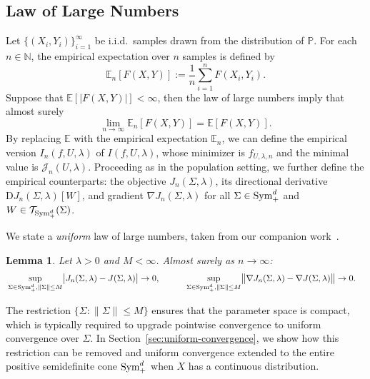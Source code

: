 \documentclass[sn-mathphys-num]{sn-jnl}%
\numberwithin{equation}{section}
\newcommand{\E}{\mathbb{E}}
\newcommand{\norm}[1]{\left\|{#1}\right\|} %
\newcommand{\N}{\mathbb{N}}
\renewcommand{\P}{\mathbb{P}}
\newtheorem{lemma}{Lemma}
\newcommand{\T}{\mathcal{T}}
\newcommand{\Sym}{{\rm \mathrm{Sym}}}
\theoremstyle{thmstyleone}%
\theoremstyle{thmstyletwo}%
\theoremstyle{thmstylethree}%
\begin{document}
\subsection{Law of Large Numbers}
\indent\indent
Let $\{(X_i, Y_i)\}_{i=1}^\infty$ be i.i.d.\ samples drawn from the distribution of $\P$.
For each $n \in \N$, the empirical expectation over $n$ samples is defined by 
\begin{equation*}
	\E_n[F(X, Y)] := \frac{1}{n} \sum_{i=1}^n F(X_i, Y_i).
\end{equation*}
Suppose that $\E[|F(X, Y)|] < \infty$, then the law of large numbers imply that almost surely 
\begin{equation*}
	\lim_{n \to \infty} \E_n[F(X, Y)] = \E[F(X, Y)].
\end{equation*}
By replacing $\E$ with the empirical expectation $\E_n$, we can define the empirical version 
$I_n(f, U, \lambda)$ of $I(f, U, \lambda)$, whose minimizer is $f_{U, \lambda, n}$ and the minimal 
value is $\mathcal{J}_n(U, \lambda)$. Proceeding as in the population setting, we further define the empirical counterparts: 
the objective $J_n(\Sigma,\lambda)$,  its directional derivative
$\mathrm{D}J_n(\Sigma,\lambda)[W]$, and gradient $\nabla J_n(\Sigma, \lambda)$ for all $\Sigma \in \Sym_+^d$ and $W \in \T_{\Sym_+^d}(\Sigma)$.

We state a \emph{uniform} law of large numbers, taken from our companion work~\cite[Proposition 4.4]{LiRu25}.

\vspace{.5em} 
\begin{lemma}
\label{lemma:law-of-large-number-constrained-set}
Let $\lambda > 0$ and $M < \infty$. Almost surely as $n \to \infty$: 
\begin{equation*}
\begin{split}
	&\sup_{\Sigma \in \Sym_+^d, \norm{\Sigma} \le M} 
	\bigl|J_n(\Sigma, \lambda) - J(\Sigma, \lambda)\bigr|
	\to 0,~~~\qquad \sup_{\Sigma \in \Sym_+^d, \norm{\Sigma} \le M} 
	\bigl\|
	\nabla J_n(\Sigma, \lambda)
	-
	\nabla J(\Sigma, \lambda)
	\bigr\|
	\to  0.
\end{split} 
\end{equation*}
\end{lemma} 
The restriction $\{\Sigma: \|\Sigma\| \le M\}$ ensures that the parameter space is compact,
which is typically required to upgrade pointwise convergence to uniform convergence over $\Sigma$.
In Section~\ref{sec:uniform-convergence}, we show how this restriction can be removed and uniform convergence extended
to the entire positive semidefinite cone $\Sym_+^d$ when $X$ has a continuous distribution.
\end{document}
